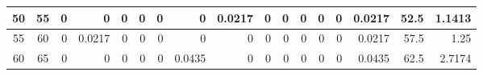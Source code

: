 \begin{table}[hb]
\begin{adjustbox}{width = \textwidth, center}
\begin{tabular}{|cc|r|r|r|r|r|r|r|r|r|r|r|r|r|r|r|}
            \cellcolor[HTML]{C8E4BE}\hspace{4.5pt}50\hspace{4.5pt}             & \cellcolor[HTML]{D9EAD3}55             & 0                                              & 0                                              & 0                                              & 0                                              & 0                                              & 0                                              & \cellcolor[HTML]{C7E9D8}0.0217                 & 0                                               & 0                                               & 0                                               & 0                                               & 0                                               & \cellcolor[HTML]{D9D2E9}0.0217                                                  & \cellcolor[HTML]{D9D2E9}52.5                                            & \cellcolor[HTML]{D9D2E9}1.1413                                                                   \\ \hline
            \rowcolor[HTML]{FFFFFF} 
            \cellcolor[HTML]{C8E4BE}55             & \cellcolor[HTML]{D9EAD3}60             & 0                                              & \cellcolor[HTML]{C7E9D8}0.0217                 & 0                                              & 0                                              & 0                                              & 0                                              & 0                                              & 0                                               & 0                                               & 0                                               & 0                                               & 0                                               & \cellcolor[HTML]{D9D2E9}0.0217                                                  & \cellcolor[HTML]{D9D2E9}57.5                                            & \cellcolor[HTML]{D9D2E9}1.25                                                                     \\ \hline
            \rowcolor[HTML]{FFFFFF} 
            \cellcolor[HTML]{C8E4BE}60             & \cellcolor[HTML]{D9EAD3}65             & 0                                              & 0                                              & 0                                              & 0                                              & 0                                              & \cellcolor[HTML]{8FD2B1}0.0435                 & 0                                              & 0                                               & 0                                               & 0                                               & 0                                               & 0                                               & \cellcolor[HTML]{D9D2E9}0.0435                                                  & \cellcolor[HTML]{D9D2E9}62.5                                            & \cellcolor[HTML]{D9D2E9}2.7174                                                                   \\ \hline

\end{tabular}
\end{adjustbox}
\end{table}
